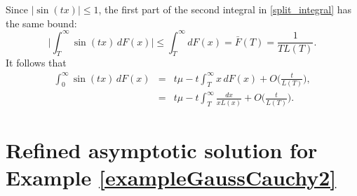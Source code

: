 \documentclass[11pt]{article}
\theoremstyle{definition}
\begin{document}
\begin{appendix}
    
	Since $|\sin(tx)| \le 1$, the first part of the second integral in \eqref{split_integral} has the same bound:
	\[
	\Big | \int_T^\infty \sin(tx)\, dF(x) \Big| \le \int_T^\infty dF(x) = \bar F(T) = \frac 1 {T L(T)}.
	\]
	It follows that
	\begin{eqnarray*}
		\int_0^\infty \sin(tx)\, dF(x) &=& t \mu  - t \int_T^\infty  x\, dF(x) + O\biggl( \frac t { L(T)} \biggr), \\
		&=& t\mu - t\int_T^\infty \frac{dx} {x L(x)} + O\biggl( \frac t { L(T)} \biggr) .
	\end{eqnarray*}
	
	\section{Refined asymptotic solution for Example \ref{exampleGaussCauchy2}}\label{appRefined}


\end{appendix}
\end{document}
